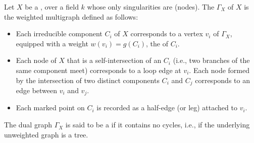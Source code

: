 \begin{definition} \label{definition:dual_graph_and_tree_of_a_nodal_curve}
    Let $X$ be a ,   over a field $k$ whose only singularities are  (nodes). The  $\Gamma_X$ of $X$ is the weighted multigraph defined as follows:
    \begin{itemize}
        \item Each irreducible component $C_i$ of $X$ corresponds to a vertex $v_i$ of $\Gamma_X$, equipped with a weight $w(v_i) = g(C_i)$, the  of $C_i$.
        \item Each node of $X$ that is a self-intersection of an  $C_i$ (i.e., two branches of the same component meet) corresponds to a loop edge at $v_i$. Each node formed by the intersection of two distinct components $C_i$ and $C_j$ corresponds to an edge between $v_i$ and $v_j$.
        \item Each  marked point on $C_i$ is recorded as a half-edge (or leg) attached to $v_i$.
    \end{itemize}

    The dual graph $\Gamma_X$ is said to be a  if it contains no cycles, i.e., if the underlying unweighted graph is a tree. \end{definition}
